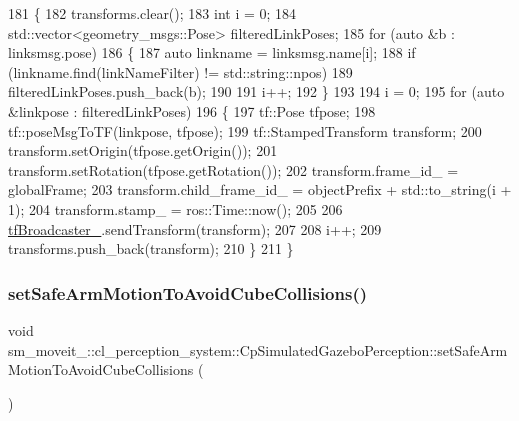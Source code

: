 \begin{DoxyCode}
181             \{
182                 transforms.clear();
183                 \textcolor{keywordtype}{int} i = 0;
184                 std::vector<geometry\_msgs::Pose> filteredLinkPoses;
185                 \textcolor{keywordflow}{for} (\textcolor{keyword}{auto} &b : linksmsg.pose)
186                 \{
187                     \textcolor{keyword}{auto} linkname = linksmsg.name[i];
188                     \textcolor{keywordflow}{if} (linkname.find(linkNameFilter) != std::string::npos)
189                         filteredLinkPoses.push\_back(b);
190 
191                     i++;
192                 \}
193 
194                 i = 0;
195                 \textcolor{keywordflow}{for} (\textcolor{keyword}{auto} &linkpose : filteredLinkPoses)
196                 \{
197                     tf::Pose tfpose;
198                     tf::poseMsgToTF(linkpose, tfpose);
199                     tf::StampedTransform transform;
200                     transform.setOrigin(tfpose.getOrigin());
201                     transform.setRotation(tfpose.getRotation());
202                     transform.frame\_id\_ = globalFrame;
203                     transform.child\_frame\_id\_ = objectPrefix + std::to\_string(i + 1);
204                     transform.stamp\_ = ros::Time::now();
205 
206                     \hyperlink{classsm__moveit__4_1_1cl__perception__system_1_1CpSimulatedGazeboPerception_a413594aa743f273c844795ff9f2f724b}{tfBroadcaster\_}.sendTransform(transform);
207 
208                     i++;
209                     transforms.push\_back(transform);
210                 \}
211             \}
\end{DoxyCode}
\mbox{\label{classsm__moveit__4_1_1cl__perception__system_1_1CpSimulatedGazeboPerception_af42b5a4e239fcac98a222c34115c9bc0}} 
\subsubsection{\texorpdfstring{set\+Safe\+Arm\+Motion\+To\+Avoid\+Cube\+Collisions()}{setSafeArmMotionToAvoidCubeCollisions()}}
{\footnotesize\ttfamily void sm\+\_\+moveit\+\_\+::cl\+\_\+perception\+\_\+system\+::\+Cp\+Simulated\+Gazebo\+Perception\+::set\+Safe\+Arm\+Motion\+To\+Avoid\+Cube\+Collisions (\begin{DoxyParamCaption}{ }\end{DoxyParamCaption})\hspace{0.3cm}{\ttfamily [inline]}}



